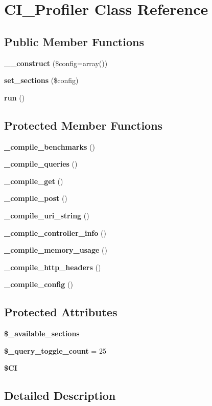 \section{C\-I\-\_\-\-Profiler Class Reference}
\label{class_c_i___profiler}
\subsection*{Public Member Functions}
\begin{DoxyCompactItemize}
\item 
{\bf \-\_\-\-\_\-construct} (\$config=array())
\item 
{\bf set\-\_\-sections} (\$config)
\item 
{\bf run} ()
\end{DoxyCompactItemize}
\subsection*{Protected Member Functions}
\begin{DoxyCompactItemize}
\item 
{\bf \-\_\-compile\-\_\-benchmarks} ()
\item 
{\bf \-\_\-compile\-\_\-queries} ()
\item 
{\bf \-\_\-compile\-\_\-get} ()
\item 
{\bf \-\_\-compile\-\_\-post} ()
\item 
{\bf \-\_\-compile\-\_\-uri\-\_\-string} ()
\item 
{\bf \-\_\-compile\-\_\-controller\-\_\-info} ()
\item 
{\bf \-\_\-compile\-\_\-memory\-\_\-usage} ()
\item 
{\bf \-\_\-compile\-\_\-http\-\_\-headers} ()
\item 
{\bf \-\_\-compile\-\_\-config} ()
\end{DoxyCompactItemize}
\subsection*{Protected Attributes}
\begin{DoxyCompactItemize}
\item 
{\bf \$\-\_\-available\-\_\-sections}
\item 
{\bf \$\-\_\-query\-\_\-toggle\-\_\-count} = 25
\item 
{\bf \$\-C\-I}
\end{DoxyCompactItemize}


\subsection{Detailed Description}


